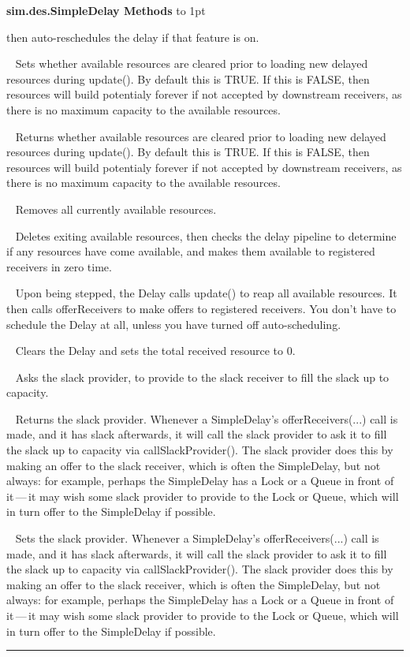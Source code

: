 \documentclass[twoside,10pt]{article}
\newcommand\class[1]{\index{Classes!{#1}}\textsf{#1}}
\newcommand*{\xfill}[1][0pt]{%
	\cleaders
		\hbox to 1pt{\hss
			\raisebox{#1}{\rule{1.2pt}{0.4pt}}%
			\hss}\hfill}
\newenvironment{methods}[1]{
\vspace{1.0em}\noindent\textsf{\textbf{#1 Methods}}\quad \xfill[0.5ex]
\vspace{-0.25em}
\begin{description}
\small}
{\end{description}\hrule\vspace{1.5em}}
\newcommand{\mthd}[1]{\item[{\sf #1}]~\newline}
\begin{document}
\begin{methods}{\class{sim.des.SimpleDelay}}
        then auto-reschedules the delay if that feature is on. 
\mthd{public void setDropsResourcesBeforeUpdate(boolean val)}
     Sets whether available resources are cleared prior to loading new delayed resources
        during update().  By default this is TRUE.  If this is FALSE, then resources will build
        potentialy forever if not accepted by downstream receivers, as there is no maximum 
        capacity to the available resources.   
\mthd{public boolean getDropsResourcesBeforeUpdate()}
Returns whether available resources are cleared prior to loading new delayed resources
        during update().  By default this is TRUE.  If this is FALSE, then resources will build
        potentialy forever if not accepted by downstream receivers, as there is no maximum 
        capacity to the available resources. 
\mthd{protected void drop()}
Removes all currently available resources. 
\mthd{protected void update()}
Deletes exiting available resources, then 
        checks the delay pipeline to determine if any resources have come available, and makes
        them available to registered receivers in zero time. 
\mthd{public void step(SimState state)}
Upon being stepped, the Delay calls update() to reap all available resources.  It then
        calls offerReceivers to make offers to registered receivers.  You don't have to
        schedule the Delay at all, unless you have turned off auto-scheduling. 
\mthd{public void reset()}
 Clears the Delay and sets the total received resource to 0.
\mthd{protected void callSlackProvider(Provider slackProvider, Receiver slackReceiver)}
Asks the slack provider, to provide to the slack receiver to fill the slack up to capacity.
\mthd{public Provider getSlackProvider()}
Returns the slack provider.  Whenever a SimpleDelay's offerReceivers(...) call is made, and it has slack afterwards,
    	it will call the slack provider to ask it to fill the slack up to capacity via callSlackProvider().  The slack provider does this by making an offer to the slack receiver, which is often the SimpleDelay,
    	but not always: for example, perhaps the SimpleDelay has a Lock or a Queue in front of it\,---\,it may wish some
    	slack provider to provide to the Lock or Queue, which will in turn offer to the SimpleDelay if possible.
\mthd{public void setSlackProvider(Provider provider)}
         Sets the slack provider.  Whenever a SimpleDelay's offerReceivers(...) call is made, and it has slack afterwards,
    	it will call the slack provider to ask it to fill the slack up to capacity via callSlackProvider().  The slack provider does this by making an offer to the slack receiver, which is often the SimpleDelay,
    	but not always: for example, perhaps the SimpleDelay has a Lock or a Queue in front of it\,---\,it may wish some
    	slack provider to provide to the Lock or Queue, which will in turn offer to the SimpleDelay if possible.


\end{methods}
\end{document}
